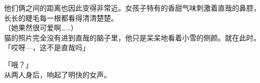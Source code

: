 他们俩之间的距离也因此变得非常近。女孩子特有的香甜气味刺激着直哉的鼻腔，长长的睫毛每一根都看得清清楚楚。\\

（她果然很可爱啊……）\\

猫的照片完全没有进到直哉的脑子里，他只是呆呆地看着小雪的侧颜。就在此时。\\

「哎呀—，这不是直哉吗」

「哦？」\\

从两人身后，响起了明快的女声。
